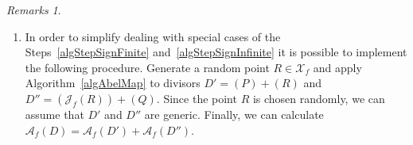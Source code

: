 \documentclass{amsart}
\numberwithin{equation}{section}
\theoremstyle{definition}
\theoremstyle{remark}
\newtheorem*{remarks}{Remarks}
\begin{document}
\begin{remarks}
\begin{enumerate}
			\item In order to simplify dealing with special cases of the Steps~\ref{algStepSignFinite} and~\ref{algStepSignInfinite} it is possible to implement the following procedure. Generate a random point $R \in \mathcal X_f$ and apply Algorithm~\ref{algAbelMap} to divisors $D' = (P) + (R)$ and $D'' = (\mathscr J_f(R)) + (Q)$. Since the point $R$ is chosen randomly, we can assume that $D'$ and $D''$ are generic. Finally, we can calculate $\mathscr A_f(D) = \mathscr A_f(D') + \mathscr A_f(D'')$.
		\end{enumerate}
	\end{remarks}
	
	\printbibliography
	
\end{document}
